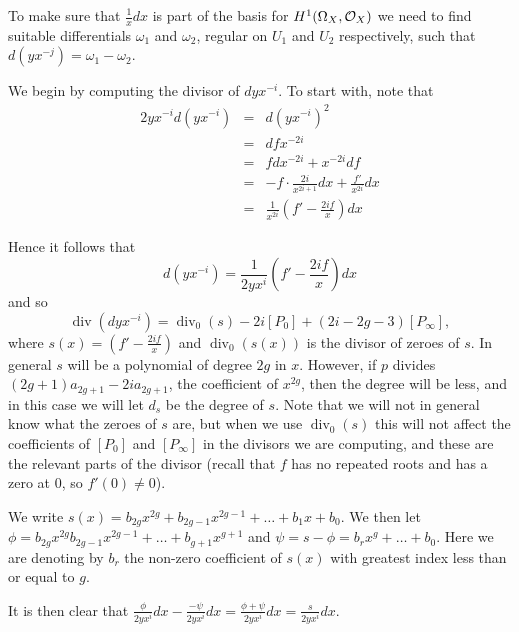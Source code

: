 \documentclass[draft, 11pt]{article} %
\theoremstyle{plain}
\theoremstyle{remark}
\newcommand{\cO}{{\cal O}}
\DeclareMathOperator{\di}{div}
\begin{document}
To make sure that $\frac{1}{x}dx$ is part of the basis for $H^1(\Omega_X,\cO_X)$ we need to find suitable differentials $\omega_1$ and $\omega_2$, regular on $U_1$ and $U_2$ respectively, such that $d(yx^{-j}) = \omega_1 - \omega_2$.


We begin by computing the divisor of $dyx^{-i}$.
To start with, note that 
\begin{eqnarray*}
2yx^{-i}d(yx^{-i}) & = & d(yx^{-i})^2 \\
& = & dfx^{-2i} \\
& = & fdx^{-2i} + x^{-2i}df \\
& = & -f\cdot\frac{2i}{x^{2i+1}}dx + \frac{f'}{x^{2i}}dx \\
& = & \frac{1}{x^{2i}}\left( f' - \frac{2if}{x}\right) dx 
\end{eqnarray*}

Hence it follows that 
\begin{equation*}
d \left( yx^{-i} \right) = \frac{1}{2yx^{i}}\left( f' - \frac{2if}{x} \right) dx
\end{equation*}
and so
\[
\di (dyx^{-i}) = \di_0(s) -2i[P_0] +(2i-2g-3)[P_\infty],
\]
where $s(x) = \left ( f'-\frac{2if}{x} \right )$ and $\di_0(s(x))$ is the divisor of zeroes of $s$.
In general $s$ will be a polynomial of degree $2g$ in $x$.
However, if $p$ divides $(2g+1)a_{2g+1}- 2ia_{2g+1}$, the coefficient of $x^{2g}$, then the degree will be less, and in this case we will let $d_s$ be the degree of $s$.
Note that we will not in general know what the zeroes of $s$ are, but when we use $\di_0(s)$ this will not affect the coefficients of $[P_0]$ and $[P_\infty]$ in the divisors we are computing, and these are the relevant parts of the divisor (recall that $f$ has no repeated roots and has a zero at $0$, so $f'(0) \neq 0$).


We write $s(x) = b_{2g}x^{2g} + b_{2g-1}x^{2g-1} + \ldots + b_1x + b_0$.
We then let $\phi = b_{2g} x^{2g} b_{2g-1}x^{2g-1} + \ldots + b_{g+1}x^{g+1} $ and $\psi = s - \phi = b_rx^g + \ldots + b_0$.
Here we are denoting by $b_r$ the non-zero coefficient of $s(x)$ with greatest index less than or equal to $g$.

It is then clear that $\frac{\phi }{2yx^i}dx - \frac{-\psi}{2yx^i}dx = \frac{\phi + \psi}{2yx^i}dx = \frac{s}{2yx^i}dx$.
\end{document}
